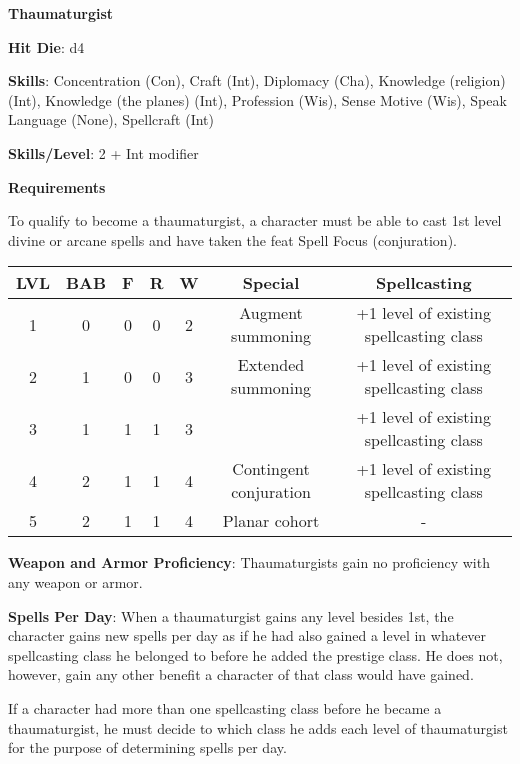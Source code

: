 \textbf{\huge{Thaumaturgist}}

\textbf{Hit Die}: d4

\textbf{Skills}: Concentration (Con), Craft (Int), Diplomacy (Cha), Knowledge (religion) (Int), Knowledge (the planes) (Int), Profession (Wis), Sense Motive (Wis), Speak Language (None), Spellcraft (Int)

\textbf{Skills/Level}: 2 + Int modifier

\textbf{\large{Requirements}}

To qualify to become a thaumaturgist, a character must be able to cast 1st level divine or arcane spells and have taken the feat Spell Focus (conjuration).

\begin{center}
\begin{adjustwidth}{-4cm}{}
\begin{small}
\begin{tabular}{| c | c | c | c | c | c | c |}
\hline
LVL &BAB &F &R &W &Special &Spellcasting \\
\hline
1 &0 &0 &0 &2 &Augment summoning &+1 level of existing spellcasting class \\
2 &1 &0 &0 &3 &Extended summoning &+1 level of existing spellcasting class \\
3 &1 &1 &1 &3 & &+1 level of existing spellcasting class \\
4 &2 &1 &1 &4 &Contingent conjuration &+1 level of existing spellcasting class \\
5 &2 &1 &1 &4 &Planar cohort &- \\
\hline
\end{tabular}
\end{small}
\end{adjustwidth}
\end{center}

\textbf{Weapon and Armor Proficiency}: Thaumaturgists gain no proficiency with any weapon or armor.

\textbf{Spells Per Day}: When a thaumaturgist gains any level besides 1st, the character gains new spells per day as if he had also gained a level in whatever spellcasting class he belonged to before he added the prestige class. He does not, however, gain any other benefit a character of that class would have gained.

If a character had more than one spellcasting class before he became a thaumaturgist, he must decide to which class he adds each level of thaumaturgist for the purpose of determining spells per day.

